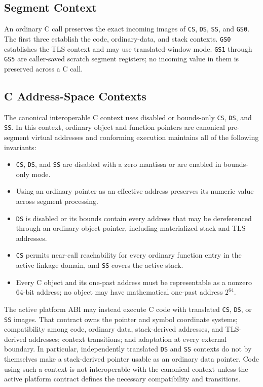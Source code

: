 \documentclass[10pt,twoside]{article}
\begin{document}
\subsection{Segment Context}
An ordinary C call preserves the exact incoming images of \texttt{CS},
\texttt{DS}, \texttt{SS}, and \texttt{GS0}. The first three establish the
code, ordinary-data, and stack contexts. \texttt{GS0} establishes the TLS
context and may use translated-window mode. \texttt{GS1} through \texttt{GS5}
are caller-saved scratch segment registers; no incoming value in them is
preserved across a C call.

\subsection{C Address-Space Contexts}
The canonical interoperable C context uses disabled or bounds-only
\texttt{CS}, \texttt{DS}, and \texttt{SS}. In this context, ordinary object and
function pointers are canonical pre-segment virtual addresses and conforming
execution maintains all of the following invariants:

\begin{itemize}
\item \texttt{CS}, \texttt{DS}, and \texttt{SS} are disabled with a zero
mantissa or are enabled in bounds-only mode.
\item Using an ordinary pointer as an effective address preserves its numeric
value across segment processing.
\item \texttt{DS} is disabled or its bounds contain every address that may be
dereferenced through an ordinary object pointer, including materialized stack
and TLS addresses.
\item \texttt{CS} permits near-call reachability for every ordinary function
entry in the active linkage domain, and \texttt{SS} covers the active stack.
\item Every C object and its one-past address must be representable as a
nonzero 64-bit address; no object may have mathematical one-past address
$2^{64}$.
\end{itemize}

The active platform ABI may instead execute C code with translated
\texttt{CS}, \texttt{DS}, or \texttt{SS} images. That contract owns the
pointer and symbol coordinate systems; compatibility among code, ordinary
data, stack-derived addresses, and TLS-derived addresses; context transitions;
and adaptation at every external boundary. In particular, independently
translated \texttt{DS} and \texttt{SS} contexts do not by themselves make a
stack-derived pointer usable as an ordinary data pointer. Code using such a
context is not interoperable with the canonical context unless the active
platform contract defines the necessary compatibility and transitions.
\end{document}

